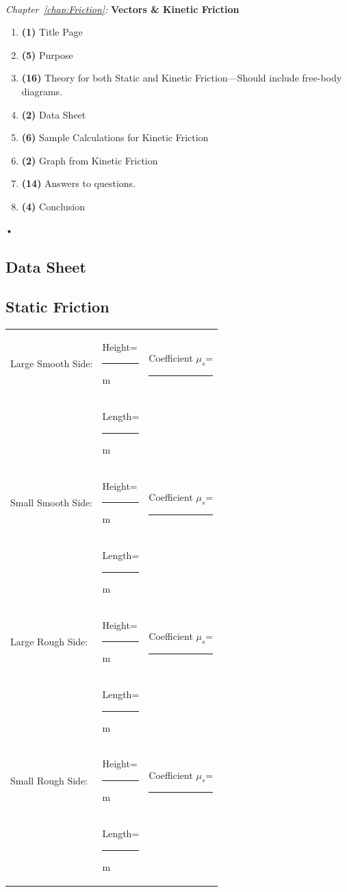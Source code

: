 \documentclass[main.tex]{subfiles}
\begin{document}
\begin{samepage}
\hrulefill \\
\emph{Chapter~\ref{chap:Friction}:} \textbf{Vectors \& Kinetic Friction}
\begin{enumerate}
\item
\textbf{(1)} Title Page
\item
\textbf{(5)} Purpose
\item
\textbf{(16)} Theory for both Static and Kinetic Friction---Should include free-body diagrams.
\item
\textbf{(2)} Data Sheet
\item
\textbf{(6)} Sample Calculations for Kinetic Friction
\item
\textbf{(2)} Graph from Kinetic Friction
\item
\textbf{(14)} Answers to questions.
\item
\textbf{(4)} Conclusion
\end{enumerate}•

\newpage
\begin{doublespace}
\section{Data Sheet}
\subsection*{Static Friction}
\begin{tabular}{lll}
Large Smooth Side: & Height=\rule[-1mm]{2.5cm}{.1pt}m & Coefficient $\mu_s$=\rule[-1mm]{2.5cm}{.1pt}\\
& Length=\rule[-1mm]{2.5cm}{.1pt}m &\\

Small Smooth Side: & Height=\rule[-1mm]{2.5cm}{.1pt}m & Coefficient $\mu_s$=\rule[-1mm]{2.5cm}{.1pt}\\
& Length=\rule[-1mm]{2.5cm}{.1pt}m &\\

Large Rough Side:& Height=\rule[-1mm]{2.5cm}{.1pt}m & Coefficient $\mu_s$=\rule[-1mm]{2.5cm}{.1pt}\\
& Length=\rule[-1mm]{2.5cm}{.1pt}m &\\

Small Rough Side: & Height=\rule[-1mm]{2.5cm}{.1pt}m & Coefficient $\mu_s$=\rule[-1mm]{2.5cm}{.1pt}\\
& Length=\rule[-1mm]{2.5cm}{.1pt}m &\\
\end{tabular}\\


\end{doublespace}
\end{samepage}
\end{document}

